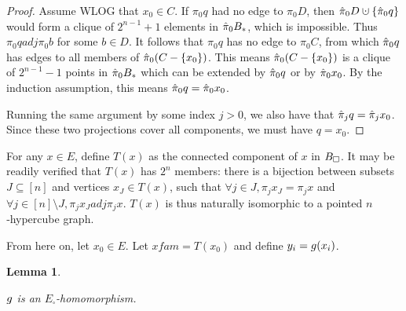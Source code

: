 \documentclass{amsart}
\newtheorem{lemma}{Lemma}
\theoremstyle{definition}
\newcommand{\cupdot}{\mathbin{\mathaccent\cdot\cup}}
\begin{document}
\begin{proof}
  Assume WLOG that $x_0 \in C$. If $\pi_0 q$ had no edge to $\pi_0 D$, then
  $\pih_0 D \cupdot \{\pih_0 q\}$ would form a clique of $2^{n-1}+1$ elements
  in $\hat{\pi}_0 B_*$, which is impossible. Thus $\pi_0 q adj \pi_0 b$ for some $b \in D$. It follows that $\pi_0 q$ has no edge to $\pi_0 C$, from which $\hat{\pi}_0 q$ has edges to all members of $\hat{\pi}_0 (C - \{x_0\})$. This means $\hat{\pi}_0 (C - \{x_0\})$ is a clique of $2^{n-1}-1$ points in $\hat{\pi}_0 B_*$ which can be extended by $\hat{\pi}_0 q$ or by $\hat{\pi}_0 x_0$. By the induction assumption, this means $\hat{\pi}_0 q = \hat{\pi}_0 x_0$.
  
  Running the same argument by some index $j > 0$, we also have that $\hat{\pi}_j q = \hat{\pi}_j x_0$. Since these two projections cover all components, we must have $q = x_0$.
\end{proof}

For any $x \in E$, define $T(x)$ as the connected component of $x$ in $B_\square$. It may be readily verified that $T(x)$ has $2^n$ members: there is a bijection between subsets $J \subseteq [n]$ and vertices $x_J \in T(x)$, such that $\forall j \in J, \pi_j x_J = \pi_j x$ and $\forall j \in [n]\setminus J, \pi_j x_J adj \pi_j x$. $T(x)$ is thus naturally isomorphic to a pointed $n$‑hypercube graph.

From here on, let $x_0 \in E$. Let $xfam = T(x_0)$ and define $y_i = g(x_i)$.


\begin{lemma} \label{one-component}

  $g$ is an $E_\square$-homomorphism.
  \end{lemma}
\end{document}
